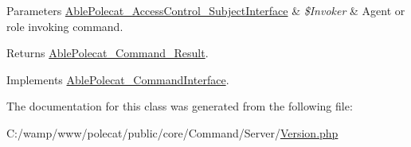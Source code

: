 \begin{DoxyParams}[1]{Parameters}
\hyperlink{interface_able_polecat___access_control___subject_interface}{Able\+Polecat\+\_\+\+Access\+Control\+\_\+\+Subject\+Interface} & {\em \$\+Invoker} & Agent or role invoking command.\\
\hline
\end{DoxyParams}
\begin{DoxyReturn}{Returns}
\hyperlink{class_able_polecat___command___result}{Able\+Polecat\+\_\+\+Command\+\_\+\+Result}. 
\end{DoxyReturn}


Implements \hyperlink{interface_able_polecat___command_interface_a6821480fe527af0afdf3691d7cffad5f}{Able\+Polecat\+\_\+\+Command\+Interface}.



The documentation for this class was generated from the following file\+:\begin{DoxyCompactItemize}
\item 
C\+:/wamp/www/polecat/public/core/\+Command/\+Server/\hyperlink{_command_2_server_2_version_8php}{Version.\+php}\end{DoxyCompactItemize}
